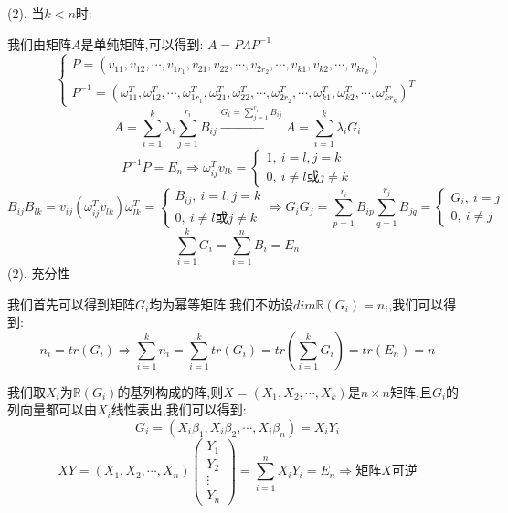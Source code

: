 \begin{anymark}[证明]
	(2). 当$k<n$时:  
	
	我们由矩阵$A$是单纯矩阵,可以得到:  $A=P\Lambda P^{-1}$
	$$\left\lbrace
	\begin{array}{l}
		P=(v_{11},v_{12},\cdots,v_{1r_{1}},v_{21},v_{22},\cdots,v_{2r_{2}},\cdots,v_{k1},v_{k2},\cdots,v_{kr_{k}})\\
		P^{-1}=(\omega_{11}^{T},\omega_{12}^{T},\cdots,\omega_{1r_{1}}^{T},\omega_{21}^{T},\omega_{22}^{T},\cdots,\omega_{2r_{2}}^{T},\cdots,\omega_{k1}^{T},\omega_{k2}^{T},\cdots,\omega_{kr_{k}}^{T})^{T}
	\end{array}
	\right. $$
	$$A=\sum\limits_{i=1}^{k}\lambda_{i}\sum\limits_{j=1}^{r_{i}}B_{ij}\stackrel{G_{i}=\sum\limits_{j=1}^{r_{i}}B_{ij}}{\longrightarrow}A=\sum\limits_{i=1}^{k}\lambda_{i}G_{i}$$
	$$P^{-1}P=E_{n}\Rightarrow \omega_{ij}^{T}v_{lk}=\left\lbrace
	\begin{array}{l}
		1,\ i=l,j=k\\
		0,\ i\neq l\text{或}j\neq k
	\end{array}
	\right. $$
	$$B_{ij}B_{lk}=v_{ij}(\omega_{ij}^{T}v_{lk})\omega_{lk}^{T}=\left\lbrace
	\begin{array}{l}
		B_{ij},\ i=l,j=k\\
		0,\ i\neq l\text{或}j\neq k
	\end{array}
	\right. \Rightarrow G_{i}G_{j}=\sum\limits_{p=1}^{r_{i}}B_{ip}\sum\limits_{q=1}^{r_{j}}B_{jq}=\left\lbrace
	\begin{array}{l}
		G_{i},\ i=j\\0,\ i\neq j
	\end{array}
	\right. $$
	$$\sum\limits_{i=1}^{k}G_{i}=\sum\limits_{i=1}^{n}B_{i}=E_{n}$$
	(2). 充分性
	
	我们首先可以得到矩阵$G_{i}$均为幂等矩阵,我们不妨设$dim\mathbb{R}(G_{i})=n_{i}$,我们可以得到:  
	$$n_{i}=tr(G_{i})\Rightarrow \sum\limits_{i=1}^{k}n_{i}=\sum\limits_{i=1}^{k}tr(G_{i})=tr(\sum\limits_{i=1}^{k}G_{i})=tr(E_{n})=n$$
	
	我们取$X_{i}$为$\mathbb{R}(G_{i})$的基列构成的阵,则$X=(X_{1},X_{2},\cdots,X_{k})$是$n\times n$矩阵,且$G_{i}$的列向量都可以由$X_{i}$线性表出,我们可以得到:  
	$$G_{i}=(X_{i}\beta_{1},X_{i}\beta_{2},\cdots,X_{i}\beta_{n})=X_{i}Y_{i}$$
	$$XY=(X_{1},X_{2},\cdots,X_{n})\left( \begin{matrix}
		Y_{1}\\Y_{2}\\\vdots\\Y_{n}
	\end{matrix}\right)=\sum\limits_{i=1}^{n}X_{i}Y_{i}=E_{n}\Rightarrow \text{矩阵}X\text{可逆}$$


\end{anymark}
